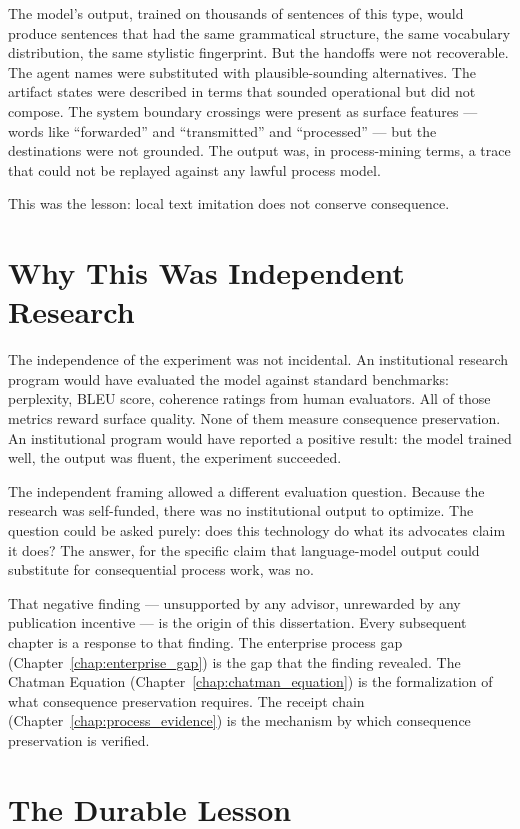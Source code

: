 The model's output, trained on thousands of sentences of this type, would produce sentences that had the same grammatical structure, the same vocabulary distribution, the same stylistic fingerprint. But the handoffs were not recoverable. The agent names were substituted with plausible-sounding alternatives. The artifact states were described in terms that sounded operational but did not compose. The system boundary crossings were present as surface features --- words like ``forwarded'' and ``transmitted'' and ``processed'' --- but the destinations were not grounded. The output was, in process-mining terms, a trace that could not be replayed against any lawful process model.

This was the lesson: local text imitation does not conserve consequence.

\section{Why This Was Independent Research}

The independence of the experiment was not incidental. An institutional research program would have evaluated the model against standard benchmarks: perplexity, BLEU score, coherence ratings from human evaluators. All of those metrics reward surface quality. None of them measure consequence preservation. An institutional program would have reported a positive result: the model trained well, the output was fluent, the experiment succeeded.

The independent framing allowed a different evaluation question. Because the research was self-funded, there was no institutional output to optimize. The question could be asked purely: does this technology do what its advocates claim it does? The answer, for the specific claim that language-model output could substitute for consequential process work, was no.

That negative finding --- unsupported by any advisor, unrewarded by any publication incentive --- is the origin of this dissertation. Every subsequent chapter is a response to that finding. The enterprise process gap (Chapter~\ref{chap:enterprise_gap}) is the gap that the finding revealed. The Chatman Equation (Chapter~\ref{chap:chatman_equation}) is the formalization of what consequence preservation requires. The receipt chain (Chapter~\ref{chap:process_evidence}) is the mechanism by which consequence preservation is verified.

\section{The Durable Lesson}

